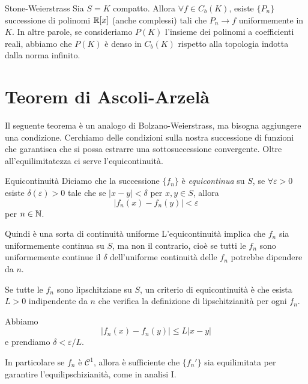 \documentclass[a4paper]{article}
\begin{document}
\begin{snippettheorem}{Stone-Weierstrass}
    Sia \(S=K\) compatto.
    Allora \(\forall f \in C_b(K)\), esiste \(\{P_n\}\) successione di polinomi
    \(\mathbb{R}[x]\) (anche complessi) tali che \(P_n \to f\) uniformemente in \(K\).
    In altre parole, se consideriamo \(P(K)\) l'insieme dei polinomi a coefficienti reali, abbiamo che
    \(P(K)\) è denso in \(C_b(K)\) rispetto alla topologia indotta
    dalla norma infinito.
\end{snippettheorem}

\section{Teorem di Ascoli-Arzelà}

Il seguente teorema è un analogo di Bolzano-Weierstrass, ma bisogna aggiungere una condizione.
Cerchiamo delle condizioni sulla nostra successione di funzioni che garantisca che
si possa estrarre una sottosuccessione convergente.
Oltre all'equilimitatezza ci serve l'equicontinuità.

\begin{snippetdefinition}{Equicontinuità}
    Diciamo che la successione \(\{f_n\}\) è \emph{equicontinua}
    su \(S\), se \(\forall \varepsilon > 0\) esiste \(\delta(\varepsilon) > 0\)
    tale che se \(|x-y| < \delta\) per \(x,y \in S\), allora
    \[
        |f_n(x) - f_n(y)| < \varepsilon
    \]
    per \(n \in \mathbb{N}\).
\end{snippetdefinition}

Quindi è una sorta di continuità uniforme 
L'equicontinuità implica che \(f_n\) sia uniformemente continua su \(S\), ma non il contrario,
cioè se tutti le \(f_n\) sono uniformemente continue il \(\delta\) dell'uniforme continuità delle \(f_n\)
potrebbe dipendere da \(n\).

\begin{snippetproposition}{}
    Se tutte le \(f_n\) sono lipschitziane su \(S\),
    un criterio di equicontinuità è che esista \(L > 0\) indipendente da \(n\)
    che verifica la definizione di lipschitzianità per ogni \(f_n\).
\end{snippetproposition}

\begin{snippetproof}{}
    Abbiamo \[
        |f_n(x) - f_n(y)| \leq L|x-y|
    \]
    e prendiamo \(\delta < \varepsilon / L\).
\end{snippetproof}

In particolare se \(f_n\) è \(\mathcal C^1\),
allora è sufficiente che \(\{f_n'\}\) sia equilimitata per garantire l'equilipschizianità,
come in analisi I.
\end{document}
